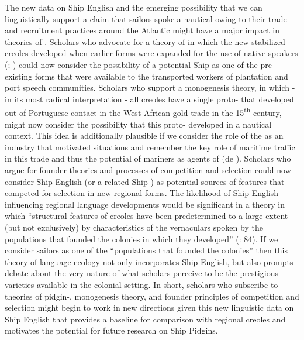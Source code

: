 The new data on Ship English and the emerging possibility that we can linguistically support a claim that sailors spoke a nautical  owing to their trade and recruitment practices around the Atlantic might have a major impact in theories of . Scholars who advocate for a theory of  in which the new stabilized creoles developed when earlier  forms were expanded for the use of native speakers (\citealt{Peyt1986}; \citealt{Holm1988}) could now consider the possibility of a potential Ship  as one of the pre-existing forms that were available to the transported workers of plantation and port speech communities. Scholars who support a monogenesis theory, in which - in its most radical interpretation - all creoles have a single proto- that developed out of Portuguese contact in the West African gold trade in the 15\textsuperscript{th} century, might now consider the possibility that this proto- developed in a nautical context. This idea is additionally plausible if we consider the role of the  as an industry that motivated  situations and remember the key role of maritime traffic in this trade and thus the potential of mariners as agents of  (de \citealt{Granada1976}). Scholars who argue for founder theories and processes of competition and selection \citep{Mufwene1996} could now consider Ship English (or a related Ship ) as potential sources of features that competed for selection in new regional forms. The likelihood of Ship English influencing regional language developments would be significant in a theory in which “structural features of creoles have been predetermined to a large extent (but not exclusively) by characteristics of the vernaculars spoken by the populations that founded the colonies in which they developed” (\citealt{Mufwene1996}: 84). If we consider sailors as one of the “populations that founded the colonies” then this theory of language ecology not only incorporates Ship English, but also prompts debate about the very nature of what scholars perceive to be the prestigious  varieties available in the colonial setting. In short, scholars who subscribe to theories of pidgin-, monogenesis theory, and founder principles of competition and selection might begin to work in new directions given this new linguistic data on Ship English that provides a baseline for comparison with regional creoles and motivates the potential for future research on Ship Pidgins. 

